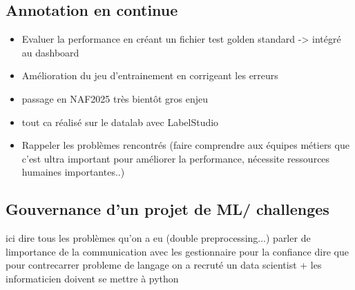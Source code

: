 \subsection{Annotation en continue}

\begin{itemize}
    \item Evaluer la performance en créant un fichier test golden standard -> intégré au dashboard
    \item Amélioration du jeu d'entrainement en corrigeant les erreurs
    \item passage en NAF2025 très bientôt gros enjeu
    \item tout ca réalisé sur le datalab avec LabelStudio
    \item Rappeler les problèmes rencontrés (faire comprendre aux équipes métiers que c'est ultra important pour améliorer la performance, nécessite ressources humaines importantes..)
\end{itemize}


\subsection{Gouvernance d'un projet de ML/ challenges}

ici dire tous les problèmes qu'on a eu (double preprocessing...)
parler de limportance de la communication avec les gestionnaire pour la confiance
dire que pour contrecarrer probleme de langage on a recruté un data scientist + les informaticien doivent se mettre à python

